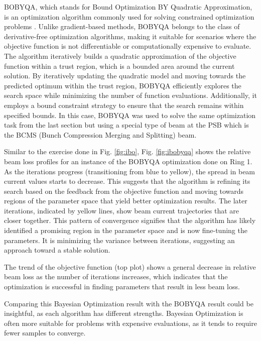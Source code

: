 BOBYQA, which stands for Bound Optimization BY Quadratic Approximation, is an optimization algorithm commonly used for solving constrained optimization problems \cite{bobyqa}. Unlike gradient-based methods, BOBYQA belongs to the class of derivative-free optimization algorithms, making it suitable for scenarios where the objective function is not differentiable or computationally expensive to evaluate. The algorithm iteratively builds a quadratic approximation of the objective function within a trust region, which is a bounded area around the current solution. By iteratively updating the quadratic model and moving towards the predicted optimum within the trust region, BOBYQA efficiently explores the search space while minimizing the number of function evaluations. Additionally, it employs a bound constraint strategy to ensure that the search remains within specified bounds. In this case, BOBYQA was used to solve the same optimization task from the last section but using a special type of beam at the PSB which is the BCMS (Bunch Compression Merging and Splitting) beam.

Similar to the exercise done in Fig. \ref{fig:ibo}, Fig. \ref{fig:ibobyqa} shows the relative beam loss profiles for an instance of the  BOBYQA optimization done on Ring 1. As the iterations progress (transitioning from blue to yellow), the spread in beam current values starts to decrease. This suggests that the algorithm is refining its search based on the feedback from the objective function and moving towards regions of the parameter space that yield better optimization results. The later iterations, indicated by yellow lines, show beam current trajectories that are closer together. This pattern of convergence signifies that the algorithm has likely identified a promising region in the parameter space and is now fine-tuning the parameters. It is minimizing the variance between iterations, suggesting an approach toward a stable solution.

The trend of the objective function (top plot) shows a general decrease in relative beam loss as the number of iterations increases, which indicates that the optimization is successful in finding parameters that result in less beam loss.

Comparing this Bayesian Optimization result with the BOBYQA result could be insightful, as each algorithm has different strengths. Bayesian Optimization is often more suitable for problems with expensive evaluations, as it tends to require fewer samples to converge.


